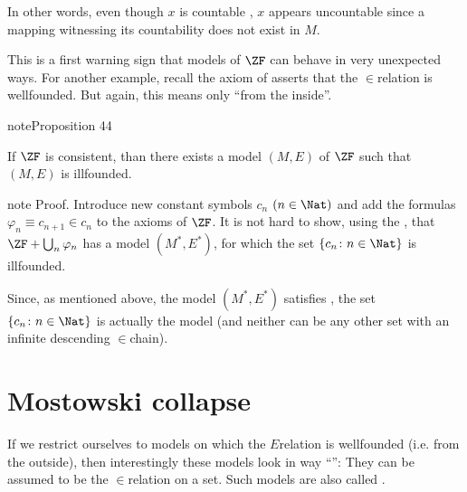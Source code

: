 \documentclass[letterpaper,10pt,english]{jupyterBook}
\begin{document}
\sphinxAtStartPar
In other words, even though \(x\) is countable , \(x\) appears uncountable  since a mapping witnessing its countability does not exist in \(M\).

\sphinxAtStartPar
This is a first warning sign that models of \(\ZF\) can behave in very unexpected ways. For another example, recall the axiom of  asserts that the \(\in\)\sphinxhyphen{}relation is well\sphinxhyphen{}founded. But again, this means only “from the inside”.
\label{models:prop-illfounded-ZF-model}
\begin{sphinxadmonition}{note}{Proposition 44}



\sphinxAtStartPar
If \(\ZF\) is consistent, than there exists a model \((M,E)\) of \(\ZF\) such that \((M,E)\) is ill\sphinxhyphen{}founded.
\end{sphinxadmonition}

\begin{sphinxadmonition}{note}
\sphinxAtStartPar
Proof. Introduce new constant symbols \(c_n\) \((n \in \Nat)\) and add the formulas \(\varphi_n \equiv c_{n+1} \in c_n\) to the axioms of \(\ZF\). It is not hard to show, using the , that \(\ZF + \bigcup_n \varphi_n\) has a model \((M^*, E^*)\), for which the set \(\{c_n \colon n \in \Nat\}\) is ill\sphinxhyphen{}founded.
\end{sphinxadmonition}

\sphinxAtStartPar
Since, as mentioned above, the model \((M^*,E^*)\) satisfies , the set \(\{c_n \colon n \in \Nat\}\) is actually  the model (and neither can be any other set with an infinite descending \(\in\)\sphinxhyphen{}chain).


\section{Mostowski collapse}
\label{\detokenize{models:mostowski-collapse}}
\sphinxAtStartPar
If we restrict ourselves to models on which the \(E\)\sphinxhyphen{}relation is  well\sphinxhyphen{}founded (i.e. from the outside), then interestingly these models look in way “”: They can be assumed to be the \(\in\)\sphinxhyphen{}relation on a set. Such models are also called .
\end{document}
